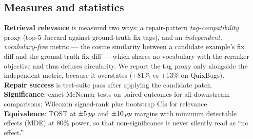 \subsection{Measures and statistics}
\textbf{Retrieval relevance} is measured two ways: a repair-pattern
\emph{tag-compatibility} proxy (top-5 Jaccard against ground-truth fix tags),
and an \emph{independent, vocabulary-free} metric --- the cosine similarity
between a candidate example's fix diff and the ground-truth fix diff ---
which shares no vocabulary with the reranker objective and thus defuses
circularity. We report the tag proxy only alongside the independent metric,
because it overstates ($+81\%$ vs $+13\%$ on QuixBugs).
\textbf{Repair success} is test-suite pass after applying the candidate
patch. \textbf{Significance}: exact McNemar tests on paired outcomes for all
downstream comparisons; Wilcoxon signed-rank plus bootstrap CIs for
relevance. \textbf{Equivalence}: TOST at $\pm 5\,pp$ and $\pm 10\,pp$ margins
with minimum detectable effects (MDE) at 80\% power, so that
non-significance is never silently read as ``no effect.''
